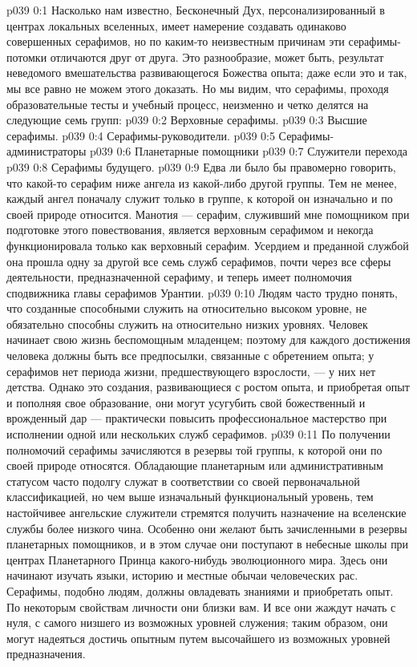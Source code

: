 \author{Мелхиседек}
\vs p039 0:1 Насколько нам известно, Бесконечный Дух, персонализированный в центрах локальных вселенных, имеет намерение создавать одинаково совершенных серафимов, но по каким\hyp{}то неизвестным причинам эти серафимы\hyp{}потомки отличаются друг от друга. Это разнообразие, может быть, результат неведомого вмешательства развивающегося Божества опыта; даже если это и так, мы все равно не можем этого доказать. Но мы видим, что серафимы, проходя образовательные тесты и учебный процесс, неизменно и четко делятся на следующие семь групп:
\vs p039 0:2 \bibnobreakspace Верховные серафимы.
\vs p039 0:3 \bibnobreakspace Высшие серафимы.
\vs p039 0:4 \bibnobreakspace Серафимы\hyp{}руководители.
\vs p039 0:5 \bibnobreakspace Серафимы\hyp{}администраторы
\vs p039 0:6 \bibnobreakspace Планетарные помощники
\vs p039 0:7 \bibnobreakspace Служители перехода
\vs p039 0:8 \bibnobreakspace Серафимы будущего.
\vs p039 0:9 \pc Едва ли было бы правомерно говорить, что какой\hyp{}то серафим ниже ангела из какой\hyp{}либо другой группы. Тем не менее, каждый ангел поначалу служит только в группе, к которой он изначально и по своей природе относится. Манотия --- серафим, служивший мне помощником при подготовке этого повествования, является верховным серафимом и некогда функционировала только как верховный серафим. Усердием и преданной службой она прошла одну за другой все семь служб серафимов, почти через все сферы деятельности, предназначенной серафиму, и теперь имеет полномочия сподвижника главы серафимов Урантии.
\vs p039 0:10 Людям часто трудно понять, что созданные способными служить на относительно высоком уровне, не обязательно способны служить на относительно низких уровнях. Человек начинает свою жизнь беспомощным младенцем; поэтому для каждого достижения человека должны быть все предпосылки, связанные с обретением опыта; у серафимов нет периода жизни, предшествующего взрослости, --- у них нет детства. Однако это создания, развивающиеся с ростом опыта, и приобретая опыт и пополняя свое образование, они могут усугубить свой божественный и врожденный дар --- практически повысить профессиональное мастерство при исполнении одной или нескольких служб серафимов.
\vs p039 0:11 По получении полномочий серафимы зачисляются в резервы той группы, к которой они по своей природе относятся. Обладающие планетарным или административным статусом часто подолгу служат в соответствии со своей первоначальной классификацией, но чем выше изначальный функциональный уровень, тем настойчивее ангельские служители стремятся получить назначение на вселенские службы более низкого чина. Особенно они желают быть зачисленными в резервы планетарных помощников, и в этом случае они поступают в небесные школы при центрах Планетарного Принца какого\hyp{}нибудь эволюционного мира. Здесь они начинают изучать языки, историю и местные обычаи человеческих рас. Серафимы, подобно людям, должны овладевать знаниями и приобретать опыт. По некоторым свойствам личности они близки вам. И все они жаждут начать с нуля, с самого низшего из возможных уровней служения; таким образом, они могут надеяться достичь опытным путем высочайшего из возможных уровней предназначения.
